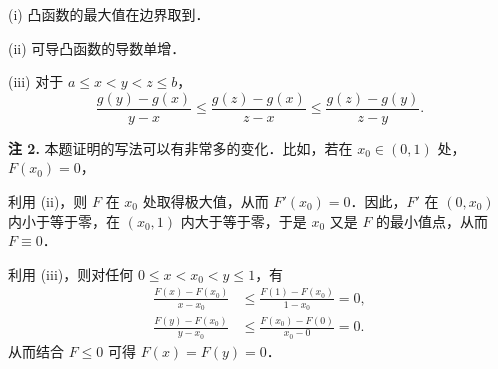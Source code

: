 \begin{solution}
(i) 凸函数的最大值在边界取到．

(ii) 可导凸函数的导数单增．

(iii) 对于 $a\leqslant x<y<z\leqslant b$，
\[
\frac{g(y)-g(x)}{y-x}\leqslant\frac{g(z)-g(x)}{z-x}\leqslant\frac{g(z)-g(y)}{z-y}.
\]

\textbf{注 2.} 本题证明的写法可以有非常多的变化．比如，若在 $x_0\in(0,1)$ 处，$F(x_0)=0$，

利用 (ii)，则 $F$ 在 $x_0$ 处取得极大值，从而 $F'(x_0)=0$．因此，$F'$ 在 $(0,x_0)$ 内小于等于零，在 $(x_0,1)$ 内大于等于零，于是 $x_0$ 又是 $F$ 的最小值点，从而 $F\equiv 0$．

利用 (iii)，则对任何 $0\leqslant x<x_0<y\leqslant 1$，有
\begin{align*}
\frac{F(x)-F(x_0)}{x-x_0}&\leqslant\frac{F(1)-F(x_0)}{1-x_0}=0,\\
\frac{F(y)-F(x_0)}{y-x_0}&\leqslant\frac{F(x_0)-F(0)}{x_0-0}=0.
\end{align*}
从而结合 $F\leqslant 0$ 可得 $F(x)=F(y)=0$．
\end{solution}

